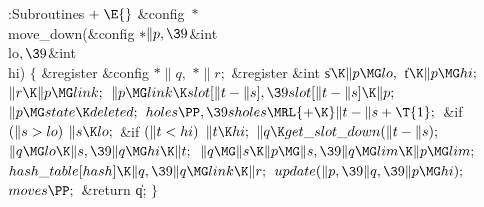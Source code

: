 \Y\B\4:Subroutines\X${}\mathrel+\E{}$\6
\&{config} ${}{*}{}$\\{move\_down}(\&{config} ${}{*}\|p,\39{}$\&{int} %
\\{lo}${},\39{}$\&{int} \\{hi})\1\1\2\2\6
${}\{{}$\1\6
\&{register} \&{config} ${}{*}\|q,{}$ ${}{*}\|r;{}$\6
\&{register} \&{int} \|s${}\K\|p\MG\\{lo},{}$ \|t${}\K\|p\MG\\{hi};{}$\7
${}\|r\K\|p\MG\\{link};{}$\6
${}\|p\MG\\{link}\K\\{slot}[\|t-\|s],\39\\{slot}[\|t-\|s]\K\|p;{}$\6
${}\|p\MG\\{state}\K\\{deleted};{}$\6
${}\\{holes}\PP,\39\\{sholes}\MRL{+{\K}}\|t-\|s+\T{1};{}$\6
\&{if} ${}(\|s>\\{lo}){}$\1\5
${}\|s\K\\{lo};{}$\2\6
\&{if} ${}(\|t<\\{hi}){}$\1\5
${}\|t\K\\{hi};{}$\2\6
${}\|q\K\\{get\_slot\_down}(\|t-\|s);{}$\6
${}\|q\MG\\{lo}\K\|s,\39\|q\MG\\{hi}\K\|t;{}$\6
${}\|q\MG\|s\K\|p\MG\|s,\39\|q\MG\\{lim}\K\|p\MG\\{lim};{}$\6
${}\\{hash\_table}[\\{hash}]\K\|q,\39\|q\MG\\{link}\K\|r;{}$\6
${}\\{update}(\|p,\39\|q,\39\|p\MG\\{hi});{}$\6
${}\\{moves}\PP;{}$\6
\&{return} \|q;\6
\4${}\}{}$\2\par
\fi


